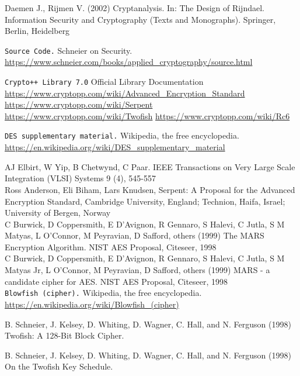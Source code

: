 \begin{thebibliography}{10}
		Daemen J., Rijmen V. (2002) Cryptanalysis. In: The Design of Rijndael. Information Security and Cryptography (Texts and Monographs). Springer, Berlin, Heidelberg
	
			\texttt{Source Code.} Schneier on Security.\\
				\url{https://www.schneier.com/books/applied_cryptography/source.html}
		
		\texttt{Crypto++ Library 7.0} Official Library Documentation
			\url{https://www.cryptopp.com/wiki/Advanced_Encryption_Standard}
			\url{https://www.cryptopp.com/wiki/Serpent}
			\url{https://www.cryptopp.com/wiki/Twofish}
			\url{https://www.cryptopp.com/wiki/Rc6}
	
		\texttt{DES supplementary material.} Wikipedia, the free encyclopedia.\\
			\url{https://en.wikipedia.org/wiki/DES_supplementary_material}
	
		AJ Elbirt, W Yip, B Chetwynd, C Paar. IEEE Transactions on Very Large Scale Integration (VLSI) Systems 9 (4), 545-557 \\

		Ross Anderson, Eli Biham, Lars Knudsen, Serpent: A Proposal for the Advanced Encryption Standard, Cambridge University, England; Technion, Haifa, Israel; University of Bergen, Norway \\
	
		C Burwick, D Coppersmith, E D’Avignon, R Gennaro, S Halevi, C Jutla, S M Matyas, L O’Connor, M Peyravian, D Safford, others (1999) The MARS Encryption Algorithm. NIST AES Proposal, Citeseer, 1998 \\
	
		C Burwick, D Coppersmith, E D’Avignon, R Gennaro, S Halevi, C Jutla, S M Matyas Jr, L O’Connor, M Peyravian, D Safford, others (1999) MARS - a candidate cipher for AES. NIST AES Proposal, Citeseer, 1998 \\
	
		\texttt{Blowfish (cipher).} Wikipedia, the free encyclopedia.\\
		\url{https://en.wikipedia.org/wiki/Blowfish_(cipher)}
	
		B. Schneier, J. Kelsey, D. Whiting, D. Wagner, C. Hall, and N. Ferguson (1998) Twofish: A 128-Bit Block Cipher.

		B. Schneier, J. Kelsey, D. Whiting, D. Wagner, C. Hall, and N. Ferguson (1998) On the Twofish Key Schedule.


\end{thebibliography}
